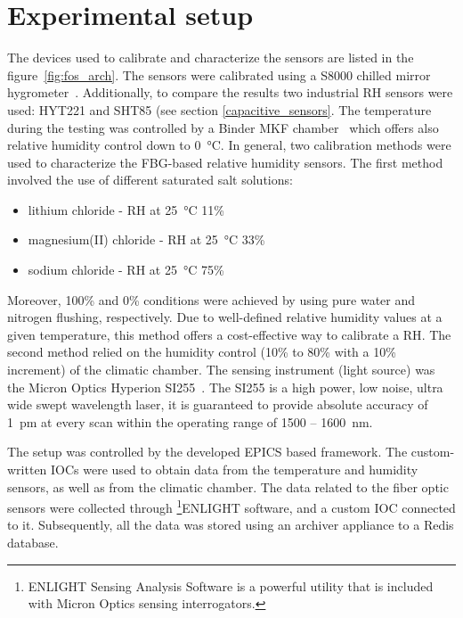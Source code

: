 \section{Experimental setup}
\label{fos:setup}
The devices used to calibrate and characterize the sensors are listed in the figure~\ref{fig:fos_arch}. The sensors were calibrated using a S8000 chilled mirror hygrometer~\cite{michell_s8000}. Additionally, to compare the results two industrial \gls{RH} sensors were used: HYT221 and SHT85 (see section \ref{capacitive_sensors}. The temperature during the testing was controlled by a Binder MKF chamber~\cite{binder} which offers also relative humidity control down to \SI{0}{\celsius}. 
In general, two calibration methods were used to characterize the \gls{FBG}-based relative humidity sensors. The first method involved the use of different saturated salt solutions:
\begin{itemize}
    \item lithium chloride - \gls{RH} at \SI{25}{\celsius} 11\%
    \item magnesium(II) chloride - \gls{RH} at \SI{25}{\celsius} 33\%
    \item sodium chloride - \gls{RH} at \SI{25}{\celsius} 75\%
\end{itemize}
Moreover, 100\% and 0\% conditions were achieved by using pure water and nitrogen flushing, respectively. Due to well-defined relative humidity values at a given temperature, this method offers a cost-effective way to calibrate a \gls{RH}. The second method relied on the humidity control (10\% to 80\% with a 10\% increment) of the climatic chamber.  The sensing instrument (light source) was the Micron Optics Hyperion SI255~\cite{si255}. The SI255 is a high power, low noise, ultra wide swept wavelength laser, it is guaranteed to provide absolute accuracy of 1~pm at every scan within the operating range of 1500 -- 1600~nm. 

The setup was controlled by the developed \gls{EPICS} based framework. The custom-written \glspl{IOC} were used to obtain data from the temperature and humidity sensors, as well as from the climatic chamber. The data related to the fiber optic sensors were collected through \footnote{ENLIGHT Sensing Analysis Software is a powerful utility that is included with Micron
Optics sensing interrogators.}{ENLIGHT} software, and a custom \gls{IOC} connected to it. Subsequently, all the data was stored using an archiver appliance to a Redis database. 

